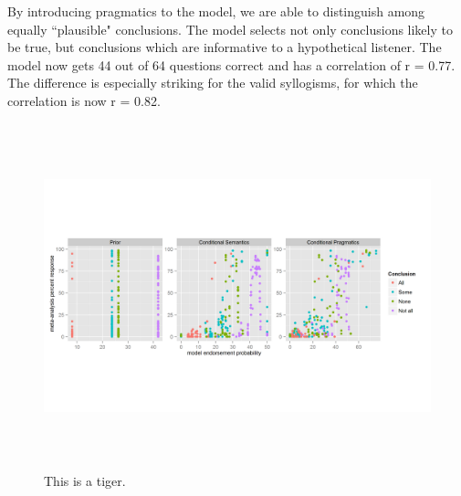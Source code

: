 \documentclass[10pt,letterpaper]{article}
\begin{document}
By introducing pragmatics to the model, we are able to distinguish among equally ``plausible" conclusions. The model selects not only conclusions likely to be true, but conclusions which are informative to a hypothetical listener. The model now gets 44 out of 64 questions correct and has a correlation of r = 0.77. The difference is especially striking for the valid syllogisms, for which the correlation is now r = 0.82. 


%

\begin{figure}[t!] %
\centering
  \includegraphics[width=\textwidth,height=10cm]{multiScatter_n6_0,25_alpha1}
  \caption{This is a tiger.}
\end{figure}
\end{document}
